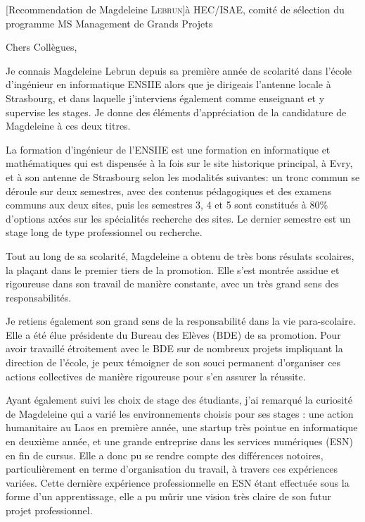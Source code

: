 \documentclass[a4paper,10pt]{article}
\begin{document}

\begin{letter}[Recommendation de Magdeleine \textsc{Lebrun}]{à}%
{HEC/ISAE, comité de sélection du programme MS Management de Grands Projets
}

Chers Collègues,

Je connais Magdeleine Lebrun depuis sa  première année de scolarité dans l'école
d'ingénieur en  informatique ENSIIE  alors que je  dirigeais l'antenne  locale à
Strasbourg,  et  dans laquelle  j'interviens  également  comme enseignant  et  y
supervise les stages.  Je donne des éléments d'appréciation de la candidature de
Magdeleine à ces deux titres.


La formation d'ingénieur de l'ENSIIE est une formation en informatique et
mathématiques qui est dispensée à la fois sur le site
historique principal, à Evry, et à son antenne de Strasbourg selon les modalités
suivantes: un tronc commun se déroule sur deux semestres, avec des contenus 
pédagogiques et des examens communs aux deux sites, puis les semestres 3, 4 et 5
sont constitués à 80\% d'options axées sur les spécialités recherche des sites.
Le dernier semestre est un stage long de type professionnel ou recherche. 

Tout  au  long de  sa  scolarité,  Magdeleine a  obtenu  de  très bons  résulats
scolaires, la plaçant dans le premier tiers de la promotion. Elle s'est montrée
assidue et rigoureuse dans son travail de manière constante, avec un très grand
sens des responsabilités. 
 

Je  retiens  également  son  grand  sens   de  la  responsabilité  dans  la  vie
para-scolaire.  Elle  a été  élue présidente  du Bureau des  Elèves (BDE)  de sa
promotion.  Pour avoir travaillé étroitement avec le BDE sur de nombreux projets
impliquant la  direction de l'école,  je peux  témoigner de son  souci permanent
d'organiser ces actions  collectives de manière rigoureuse pour  s'en assurer la
réussite.

Ayant  également suivi  les  choix  de stage  des  étudiants,  j'ai remarqué  la
curiosité de Magdeleine qui a varié les environnements choisis pour ses stages :
une action  humanitaire au Laos en  première année, une startup  très pointue en
informatique  en deuxième  année, et  une  grande entreprise  dans les  services
numériques (ESN) en fin de cursus. Elle a donc pu se rendre compte des différences
notoires, particulièrement en terme d'organisation du travail, à travers ces
expériences variées. Cette dernière expérience professionnelle en ESN étant
effectuée sous la forme d'un apprentissage, elle a pu mûrir une vision très
claire de son futur projet professionnel.



\end{letter}
\end{document}
